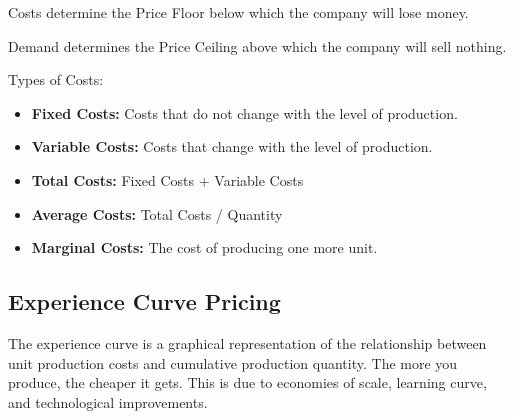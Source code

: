 \begin{center}

\end{center}

Costs determine the Price Floor below which the company will lose money.

Demand determines the Price Ceiling above which the company will sell nothing.

Types of Costs:
\begin{itemize}
	\item \textbf{Fixed Costs:} Costs that do not change with the level of production.
	\item \textbf{Variable Costs:} Costs that change with the level of production.
	\item \textbf{Total Costs:} Fixed Costs + Variable Costs
	\item \textbf{Average Costs:} Total Costs / Quantity
	\item \textbf{Marginal Costs:} The cost of producing one more unit.
\end{itemize}

\subsection{Experience Curve Pricing}
The experience curve is a graphical representation of the relationship between unit production costs and cumulative production quantity. The more you produce, the cheaper it gets. This is due to economies of scale, learning curve, and technological improvements.

